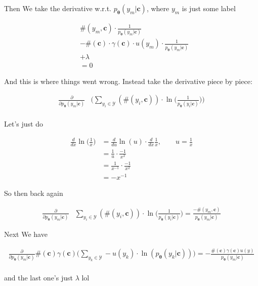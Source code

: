 \documentclass{article}
\newcommand{\vtheta}{\boldsymbol{\theta}}
\newcommand{\model}{p_{\vtheta}}
\newcommand{\context}{\boldsymbol{c}}
\begin{document}
			Then We take the derivative w.r.t. $\model(y_m|\context)$, where $y_m$ is just some label
			
			\begin{align}
				&\#(y_m, \context)\cdot  \frac{1}{\model(y_m|\context)} 	 \\
				&- \#(\context)\cdot \gamma(\context)\cdot u(y_m)\cdot\frac{1}{\model(y_m|\context)} \\
				&+ \lambda \\
				&=0
			\end{align}	
			
			And this is where things went wrong. Instead take the derivative piece by piece:
			
			\begin{align}
				\frac{\partial}{\partial \model(y_m|\context)} &\bigg(\sum_{y_i\in\mathcal{Y}} (\#(y_i, \context))\cdot  \ln\bigg(\frac{1}{\model(y_i|\context)} 	\bigg)\bigg) \\
			\end{align}
			
			Let's just do
			
			\begin{align}
				\frac{d}{d x} \ln\bigg(\frac{1}{x} \bigg) &= \frac{d}{du}\ln(u)\cdot \frac{d}{dx} \frac{1}{x},\quad\quad u=\frac{1}{x}\\
			&= \frac{1}{u}\cdot \frac{-1}{x^2}\\
			&= \frac{1}{x^{-1}}\cdot \frac{-1}{x^2}\\
			&= -x^{-1}
			\end{align}
			
			So then back again
		
			\begin{align}
				\frac{\partial}{\partial \model(y_m|\context)} &\sum_{y_i\in\mathcal{Y}} (\#(y_i, \context))\cdot  \ln\bigg(\frac{1}{\model(y_i|\context)} 	\bigg)  =  \frac{-\#(y_m, \context)}{\model(y_m|\context)}
			\end{align}
			
			Next We have
			
			\begin{align}
				\frac{\partial}{\partial \model(y_m|\context)} \#(\context)\gamma(\context)\bigg(\sum_{y_k\in\mathcal{Y}} - u(y_k)\cdot\ln(\model(y_k|\context))\bigg) = -\frac{\#(\context)\gamma(\context)u(y)}{\model(y_m|\context)} \\
			\end{align}	
		
			and the last one's just $\lambda$ lol
			
\end{document}
